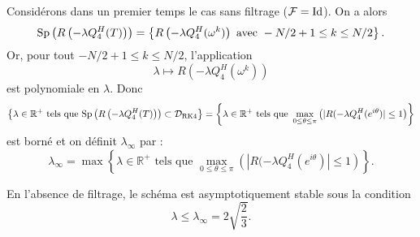 Considérons dans un premier temps le cas sans filtrage ($\mathcal{F} = \text{Id}$). On a alors 
\begin{equation}
\text{Sp} \left( R \left( -\lambda Q_{4}^H(T) \right) \right)= \left\lbrace
R \left( -\lambda Q_{4}^H(\omega^k) \right) \text{ avec } -N/2+1 \leq k \leq N/2
\right\rbrace .
\end{equation}
Or, pour tout $-N/2+1 \leq k \leq N/2$, l'application
\begin{equation}
\lambda \mapsto R \left( -\lambda Q_{4}^H(\omega^k) \right)
\end{equation}
est polynomiale en $\lambda$. Donc 
\begin{equation}
\left\lbrace \lambda \in \mathbb{R}^+ \text{ tels que } \Sp \left( R \left( -\lambda Q_{4}^H(T) \right) \right) \subset \mathcal{D}_{\RK4} \right\rbrace = \left\lbrace \lambda \in \mathbb{R}^+ \text{ tels que } \max_{0 \leq \theta \leq \pi} \left( | R(-\lambda Q_4^H(e^{i \theta}) | \leq 1 \right) \right\rbrace
\end{equation}
est borné et on définit $\lambda_{\infty}$ par :
\begin{equation}
\lambda_{\infty} = \max \left\lbrace \lambda \in \mathbb{R}^+ \text{ tels que } \max_{0 \leq \theta \leq \pi} \left( | R(-\lambda Q_4^H(e^{i \theta}) | \leq 1 \right) \right\rbrace.
\end{equation}

\begin{proposition}
En l'absence de filtrage, le schéma est asymptotiquement stable sous la condition 
\begin{equation}
\lambda \leq \lambda_{\infty} = 2\sqrt{\dfrac{2}{3}}.
\end{equation}
\end{proposition}

